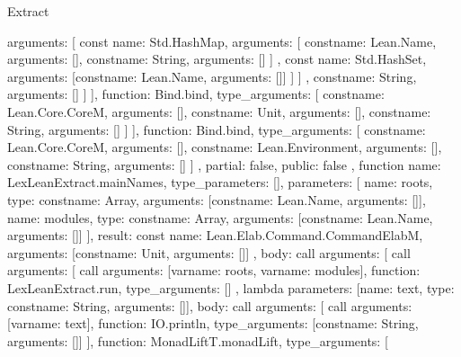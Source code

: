 \begin{lexlean}{Extract}
\begin{toolingmodule}
{{{{{{{{{                            arguments: [
                              const{
                                name: Std.HashMap,
                                arguments: [
                                  const{name: Lean.Name, arguments: []},
                                  const{name: String, arguments: []}
                                ]
                              },
                              const{
                                name: Std.HashSet,
                                arguments: [const{name: Lean.Name, arguments: []}]
                              }
                            ]
                          }
                        ]
                      },
                      const{name: String, arguments: []}
                    ]
                  }
                }
              ],
              function: Bind.bind,
              type_arguments: [
                const{name: Lean.Core.CoreM, arguments: []},
                const{name: Unit, arguments: []},
                const{name: String, arguments: []}
              ]
            }
          }
        ],
        function: Bind.bind,
        type_arguments: [
          const{name: Lean.Core.CoreM, arguments: []},
          const{name: Lean.Environment, arguments: []},
          const{name: String, arguments: []}
        ]
      },
      partial: false,
      public: false
    },
    function{
      name: LexLeanExtract.mainNames,
      type_parameters: [],
      parameters: [
        {name: roots, type: const{name: Array, arguments: [const{name: Lean.Name, arguments: []}]}},
        {
          name: modules,
          type: const{name: Array, arguments: [const{name: Lean.Name, arguments: []}]}
        }
      ],
      result: const{
        name: Lean.Elab.Command.CommandElabM,
        arguments: [const{name: Unit, arguments: []}]
      },
      body: call{
        arguments: [
          call{
            arguments: [
              call{
                arguments: [var{name: roots}, var{name: modules}],
                function: LexLeanExtract.run,
                type_arguments: []
              },
              lambda{
                parameters: [{name: text, type: const{name: String, arguments: []}}],
                body: call{
                  arguments: [
                    call{
                      arguments: [var{name: text}],
                      function: IO.println,
                      type_arguments: [const{name: String, arguments: []}]
                    }
                  ],
                  function: MonadLiftT.monadLift,
                  type_arguments: [
}}}}}}
\end{toolingmodule}
\end{lexlean}
